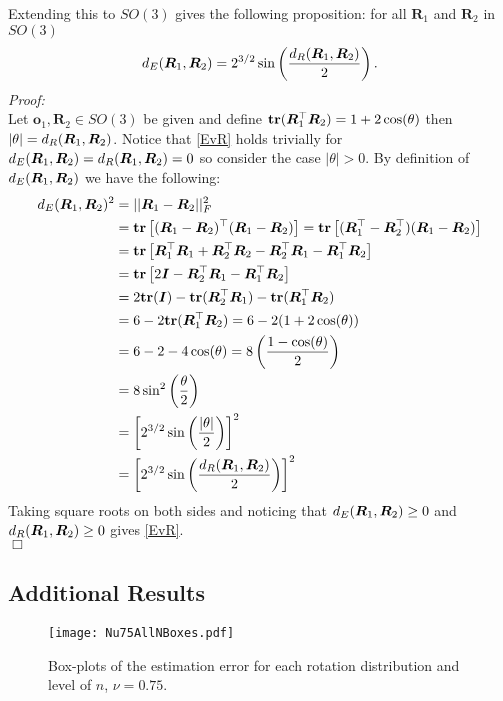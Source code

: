 Extending this to $SO(3)$ gives the following proposition: for all $\bm{R}_1$ and $\bm{R}_2$ in $SO(3)$
\begin{equation}\label{EvR}
{d_E} (\bm{R}_1,\bm{R}_2)=2^{3/2}\sin\left(\frac{{d_R}(\bm{R}_1,\bm{R}_2)}{2}\right).
\end{equation}
\emph{Proof:}\\
Let $\bm{o}_1,\bm{R}_2\in SO(3)$ be given and define ${\mathbf{tr}}(\bm R_1^\top\bm R_2)=1+2\cos(\theta)$ then $|\theta|={d_R}(\bm R_1,\bm R_2)$.  Notice that \eqref{EvR} holds trivially for ${d_E} (\bm R_1,\bm R_2)={d_R}(\bm R_1,\bm R_2)=0$ so consider the case $|\theta|>0$.  By definition of ${d_E} (\bm R_1,\bm R_2)$ we have the following:
\begin{align*}
{d_E} (\bm R_1,\bm R_2)^2
&=||\bm R_1-\bm R_2||_F^2\\
&={\mathbf{tr}}\left[(\bm R_1-\bm R_2)^\top(\bm R_1-\bm R_2)\right]={\mathbf{tr}}\left[(\bm R_1^\top-\bm R_2^\top)(\bm R_1-\bm R_2)\right]\\
&={\mathbf{tr}}\left[\bm R_1^\top\bm R_1+\bm R_2^\top\bm R_2-\bm R_2^\top\bm R_1-\bm R_1^\top\bm R_2\right]\\
&={\mathbf{tr}}\left[2\bm{I}-\bm R_2^\top\bm R_1-\bm R_1^\top\bm R_2\right]\\
&=2{\mathbf{tr}}(\bm{I})-{\mathbf{tr}}(\bm R_2^\top\bm R_1)-{\mathbf{tr}}(\bm R_1^\top\bm R_2)\\
&=6-2{\mathbf{tr}}(\bm R_1^\top\bm R_2)=6-2(1+2\cos(\theta))\\
&=6-2-4\cos(\theta)=8\left(\frac{1-\cos(\theta)}{2}\right)\\
&=8\sin^2\left(\frac{\theta}{2}\right)\\
&=\left[2^{3/2}\sin\left(\frac{|\theta|}{2}\right)\right]^2\\
&=\left[2^{3/2}\sin\left(\frac{{d_R}(\bm R_1,\bm R_2)}{2}\right)\right]^2
\end{align*}
Taking square roots on both sides and noticing that ${d_E} (\bm R_1,\bm R_2)\geq0$ and ${d_R} (\bm R_1,\bm R_2)\geq0$ gives \eqref{EvR}.\\
$\Box$

\subsection{Additional Results}

\begin{figure}[h!]
\centering
\texttt{[image: Nu75AllNBoxes.pdf]}
\caption{Box-plots of the estimation error for each rotation distribution and level of $n$,  $\nu=0.75$.}
\label{fig:NBoxes}
\end{figure}

